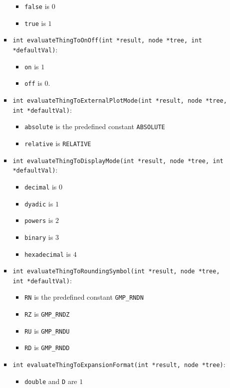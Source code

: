 \documentclass{article}
\begin{document}
\begin{itemize}
\begin{itemize}
\begin{itemize}
      \begin{itemize}
      \item \texttt{false} is $0$
      \item \texttt{true} is $1$
      \end{itemize}
    \item \texttt{int evaluateThingToOnOff(int *result, node *tree, int *defaultVal)}:
      \begin{itemize}
      \item \texttt{on} is $1$
      \item \texttt{off} is $0$.
      \end{itemize}
    \item \texttt{int evaluateThingToExternalPlotMode(int *result, node *tree, int *defaultVal)}:
      \begin{itemize}
      \item \texttt{absolute} is the predefined constant \texttt{ABSOLUTE}
      \item \texttt{relative} is \texttt{RELATIVE} 
      \end{itemize}
    \item \texttt{int evaluateThingToDisplayMode(int *result, node *tree, int *defaultVal)}:
      \begin{itemize}
      \item \texttt{decimal} is $0$
      \item \texttt{dyadic} is $1$
      \item \texttt{powers} is $2$
      \item \texttt{binary} is $3$
      \item \texttt{hexadecimal} is $4$
      \end{itemize}
    \item \texttt{int evaluateThingToRoundingSymbol(int *result, node *tree, int *defaultVal)}:
      \begin{itemize}
      \item \texttt{RN} is the predefined constant \texttt{GMP\_RNDN}
      \item \texttt{RZ} is \texttt{GMP\_RNDZ}
      \item \texttt{RU} is \texttt{GMP\_RNDU}
      \item \texttt{RD} is \texttt{GMP\_RNDD}
      \end{itemize}
    \item \texttt{int evaluateThingToExpansionFormat(int *result, node *tree)}:
      \begin{itemize}
      \item \texttt{double} and \texttt{D} are $1$

\end{itemize}
\end{itemize}
\end{itemize}
\end{itemize}
\end{document}
